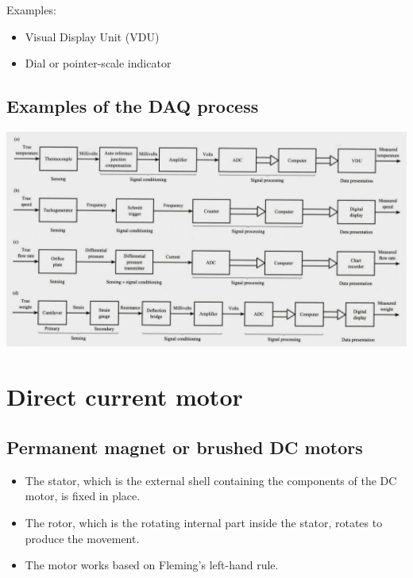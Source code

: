 \documentclass[11pt]{article}
\begin{document}
Examples:
\begin{itemize}
\item Visual Display Unit (VDU)
\item Dial or pointer-scale indicator
\end{itemize}
\subsection{Examples of the DAQ process}
\label{sec:org9a448c3}
\begin{center}
\includegraphics[width=.9\linewidth]{./images/data-acquisition-process-examples.png}
\end{center}

 \newpage
\section{Direct current motor}
\label{sec:orgf07dcad}

\subsection{Permanent magnet or brushed DC motors}
\label{sec:org6b83f5c}
\begin{itemize}
\item The stator, which is the external shell containing the components of the DC motor, is fixed in place.
\item The rotor, which is the rotating internal part inside the stator, rotates to produce the movement.
\item The motor works based on Fleming's left-hand rule.
\end{itemize}
\end{document}
